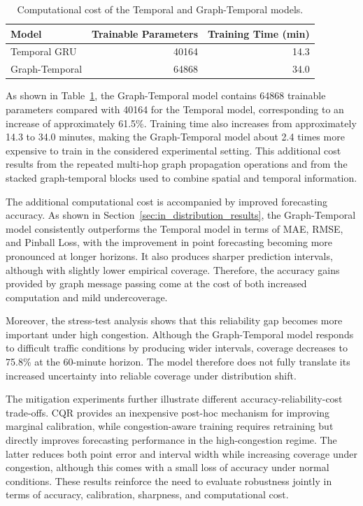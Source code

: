 \begin{table}[t]
    \centering
    \caption{Computational cost of the Temporal and Graph-Temporal models.}
    \label{tab:computational_cost}
    \begin{tabular}{lrr}
        \toprule
        Model & Trainable Parameters & Training Time (min) \\
        \midrule
        Temporal GRU   & 40164 & 14.3 \\
        Graph-Temporal & 64868 & 34.0 \\
        \bottomrule
    \end{tabular}
\end{table}

As shown in Table~\ref{tab:computational_cost}, the Graph-Temporal model
contains 64868 trainable parameters compared with 40164 for the Temporal
model, corresponding to an increase of approximately 61.5\%. Training time also
increases from approximately 14.3 to 34.0 minutes, making the Graph-Temporal
model about 2.4 times more expensive to train in the considered experimental
setting.
This additional cost results from the repeated multi-hop graph propagation
operations and from the stacked graph-temporal blocks used to combine spatial
and temporal information.


The additional computational cost is accompanied by improved forecasting
accuracy. As shown in Section~\ref{sec:in_distribution_results}, the
Graph-Temporal model consistently outperforms the Temporal model in terms of
MAE, RMSE, and Pinball Loss, with the improvement in point forecasting
becoming more pronounced at longer horizons. It also produces sharper
prediction intervals, although with slightly lower empirical coverage.
Therefore, the accuracy gains provided by graph message passing come at the
cost of both increased computation and mild undercoverage.

Moreover, the stress-test analysis shows that this reliability gap becomes
more important under high congestion. Although the Graph-Temporal model
responds to difficult traffic conditions by producing wider intervals,
coverage decreases to 75.8\% at the 60-minute horizon. The model therefore
does not fully translate its increased uncertainty into reliable coverage
under distribution shift.

The mitigation experiments further illustrate different
accuracy-reliability-cost trade-offs. CQR provides an inexpensive post-hoc
mechanism for improving marginal calibration, while congestion-aware training
requires retraining but directly improves forecasting performance in the
high-congestion regime. The latter reduces both point error and interval width
while increasing coverage under congestion, although this comes with a small
loss of accuracy under normal conditions. These results reinforce the need
to evaluate robustness jointly in terms of accuracy, calibration, sharpness,
and computational cost.

